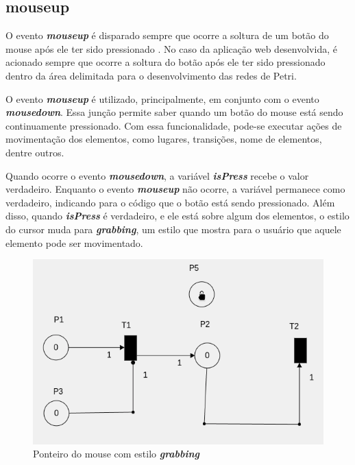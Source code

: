 \documentclass[
	12pt,				%
	openright,			%
	oneside,			%
	a4paper,			%
	english,			%
	brazil				%
	]{abntex2}
\theoremstyle{doispontos}
\begin{document}
\subsection{mouseup}\label{cap:mouseup}

O evento \textbf{\textit{mouseup}} é disparado sempre que ocorre a soltura de um botão do mouse após ele ter sido pressionado \textcite{mdn_mouseup_event}. No caso da aplicação web desenvolvida, é acionado sempre que ocorre a soltura do botão após ele ter sido pressionado dentro da área delimitada para o desenvolvimento das redes de Petri.



O evento \textbf{\textit{mouseup}} é utilizado, principalmente, em conjunto com o evento \textbf{\textit{mousedown}}. Essa junção permite saber quando um botão do mouse está sendo continuamente pressionado. Com essa funcionalidade, pode-se executar ações de movimentação dos elementos, como lugares, transições, nome de elementos, dentre outros. 



Quando ocorre o evento \textbf{\textit{mousedown}}, a variável \textbf{\textit{isPress}} recebe o valor verdadeiro. Enquanto o evento \textbf{\textit{mouseup}} não ocorre, a variável permanece como verdadeiro, indicando para o código que o botão está sendo pressionado. Além disso, quando \textbf{\textit{isPress}} é verdadeiro, e ele está sobre algum dos elementos, o estilo do cursor muda para \textbf{\textit{grabbing}}, um estilo que mostra para o usuário que aquele elemento pode ser movimentado. 

\begin{figure}[ht] 
	\centering
	\includegraphics[scale=0.4]{figuras/mouse_estilo_grabbing.png}
	\caption[Mouse estilo grabbing]{Ponteiro do mouse com estilo \textbf{\textit{grabbing}}}
	\label{fig:mouse_estilo_grabbing}
\end{figure}
\FloatBarrier
\end{document}
